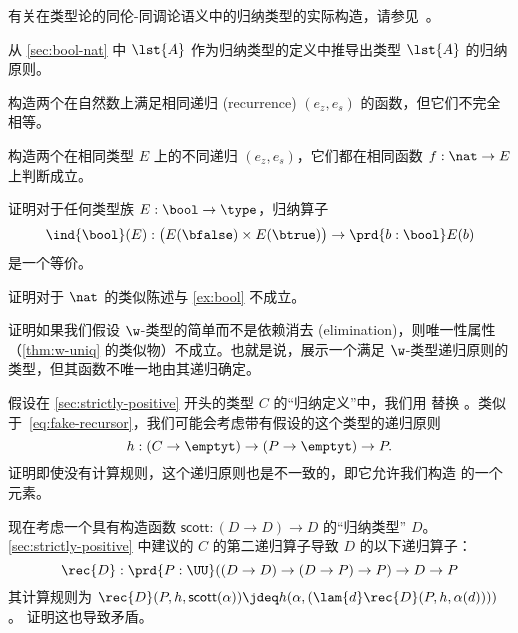 有关在类型论的同伦-同调论语义中的归纳类型的实际构造，请参见~\cite{klv:ssetmodel,mvdb:wtypes,ls:hits}。

\sectionExercises

\begin{ex}\label{ex:ind-lst}
从 \cref{sec:bool-nat} 中 $\lst{A}$ 作为归纳类型的定义中推导出类型 $\lst{A}$ 的归纳原则。
\end{ex}

\begin{ex}\label{ex:same-recurrence-not-defeq}
构造两个在自然数上满足相同递归 (recurrence) $(e_z, e_s)$ 的函数，但它们不完全相等。
\end{ex}

\begin{ex}\label{ex:one-function-two-recurrences}
构造两个在相同类型 $E$ 上的不同递归 $(e_z,e_s)$，它们都在相同函数 $f:\nat\to E$ 上判断成立。
\end{ex}

\begin{ex}\label{ex:bool}
证明对于任何类型族 $E : \bool \to \type$，归纳算子
\[ \ind{\bool}(E) : \big(E(\bfalse) \times E(\btrue)\big) \to \prd{b : \bool} E(b) \]
是一个等价。
\end{ex}

\begin{ex}\label{ex:ind-nat-not-equiv}
证明对于 $\nat$ 的类似陈述与 \cref{ex:bool} 不成立。
\end{ex}

\begin{ex}\label{ex:no-dep-uniqueness-failure}
证明如果我们假设 $\w$-类型的简单而不是依赖消去 (elimination)，则唯一性属性（\cref{thm:w-uniq} 的类似物）不成立。也就是说，展示一个满足 $\w$-类型递归原则的类型，但其函数不唯一地由其递归确定。
\end{ex}

\begin{ex}\label{ex:loop}
假设在 \cref{sec:strictly-positive} 开头的类型 $C$ 的“归纳定义”中，我们用 \emptyt 替换 \nat。类似于~\eqref{eq:fake-recursor}，我们可能会考虑带有假设的这个类型的递归原则
\[ h:(C\to\emptyt) \to (P\to\emptyt) \to P. \]
证明即使没有计算规则，这个递归原则也是不一致的，即它允许我们构造 \emptyt 的一个元素。
\end{ex}

\begin{ex}\label{ex:loop2}
现在考虑一个具有构造函数 $\mathsf{scott}:(D\to D) \to D$ 的“归纳类型” $D$。
%
\cref{sec:strictly-positive} 中建议的 $C$ 的第二递归算子导致 $D$ 的以下递归算子：
\[ \rec{D} : \prd{P:\UU} ((D\to D) \to (D\to P)\to P) \to D \to P \]
其计算规则为 $\rec{D}(P,h,\mathsf{scott}(\alpha)) \jdeq h(\alpha,(\lam{d} \rec{D}(P,h,\alpha(d))))$。
证明这也导致矛盾。
\end{ex}

